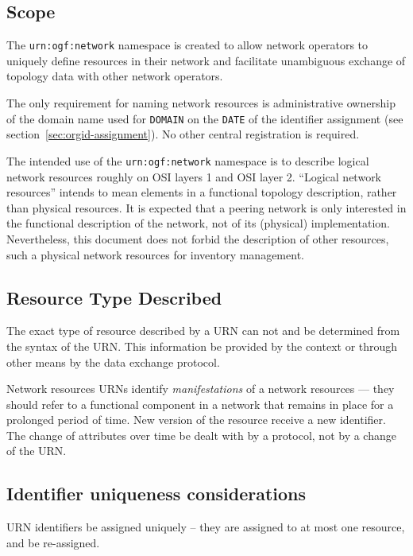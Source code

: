 \documentclass[12pt]{article}  %
\begin{document}
\subsection{Scope}

The \texttt{urn:ogf:network} namespace is created to allow network 
operators to uniquely define resources in their network and facilitate 
unambiguous exchange of topology data with other network operators.

The only requirement for naming network resources is administrative 
ownership of the domain name used for \texttt{DOMAIN} on the \texttt{DATE} of the identifier assignment (see section~\ref{sec:orgid-assignment}). 
No other central registration is required.

The intended use of the \texttt{urn:ogf:network} namespace is to describe 
logical network resources roughly on OSI layers 1 and OSI layer 2. 
“Logical network resources” intends to mean elements in a functional topology 
description, rather than physical resources. It is expected that a peering 
network is only interested in the functional description of the network, 
not of its (physical) implementation. Nevertheless, this document does 
not forbid the description of other resources, such a physical network 
resources for inventory management.

\subsection{Resource Type Described}

The exact type of resource described by a URN can not and \MUSTNOT{} be 
determined from the syntax of the URN. This information \MUST{} be provided 
by the context or through other means by the data exchange protocol.

Network resources URNs \SHOULD{} identify \emph{manifestations} of a 
network resources --- they should refer to a functional component in a 
network that remains in place for a prolonged period of time. 
New version of the resource \SHOULDNOT{} receive a new identifier.
The change of attributes over time \SHOULD{} be dealt with by a protocol, 
not by a change of the URN.

\subsection{Identifier uniqueness considerations}

URN identifiers \MUST{} be assigned uniquely -- they are assigned to 
at most one resource, and \MUSTNOT{} be re-assigned.
\end{document}
